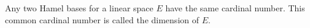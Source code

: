 Any two Hamel bases for a linear space $E$ have the same cardinal number. This common cardinal number is called the dimension of $E$.
